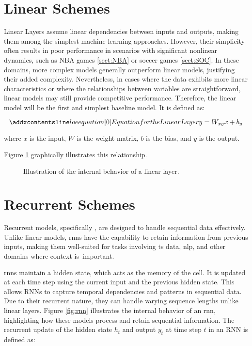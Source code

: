 \section{Linear Schemes}
\label{sect:linear}

Linear Layers assume linear dependencies between inputs and outputs, making them among the simplest machine learning approaches. However, their simplicity often results in poor performance in scenarios with significant nonlinear dynamics, such as NBA games \ref{sect:NBA} or soccer games \ref{sect:SOC}. In these domains, more complex models generally outperform linear models, justifying their added complexity. Nevertheless, in cases where the data exhibits more linear characteristics or where the relationships between variables are straightforward, linear models may still provide competitive performance. Therefore, the linear model will be the first and simplest baseline model. It is defined as:

\begin{equation}
    \setequationentry{Equation for the Linear Layer}
    y = W_{xy}x + b_y
\end{equation}

where \( x \) is the input, \( W \) is the weight matrix, \( b \) is the bias, and \( y \) is the output.

Figure \ref{fig:linear-layer} graphically illustrates this relationship.

\begin{figure}[h]
    \centering
    
    \caption{Illustration of the internal behavior of a linear layer.}
    \label{fig:linear-layer}
\end{figure}

\section{Recurrent Schemes}
\label{sect:rnn}
Recurrent models, specifically , are designed to handle sequential data effectively. Unlike linear models, \glspl{rnn} have the capability to retain information from previous inputs, making them well-suited for tasks involving \gls{ts} data, \gls{nlp}, and other domains where context is~important.

\glspl{rnn} maintain a hidden state, which acts as the memory of the cell. It is updated at each time step using the current input and the previous hidden state. This allows RNNs to capture temporal dependencies and patterns in sequential data. Due to their recurrent nature, they can handle varying sequence lengths unlike linear layers. Figure \ref{fig:rnn} illustrates the internal behavior of an \gls{rnn}, highlighting how these models process and retain sequential information. The recurrent update of the hidden state \( h_t \) and output \( y_t \) at time step \( t \) in an RNN is defined as:

